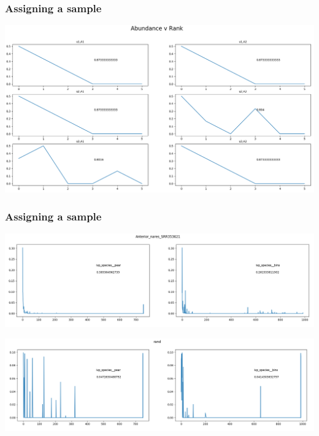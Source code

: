 \documentclass{beamer}
\begin{document}
\begin{frame}
\frametitle{Assigning a sample}

	\begin{center}
		\includegraphics[scale = 0.3]{../tiny.png}	
	\end{center}

\end{frame}
\begin{frame}
\frametitle{Assigning a sample}

	\begin{center}
		\includegraphics[scale = 0.25]{../a_nares.png}	
	\end{center}

	\begin{center}
	\includegraphics[scale = 0.25]{../random.png}	
\end{center}

\end{frame}
\end{document}
